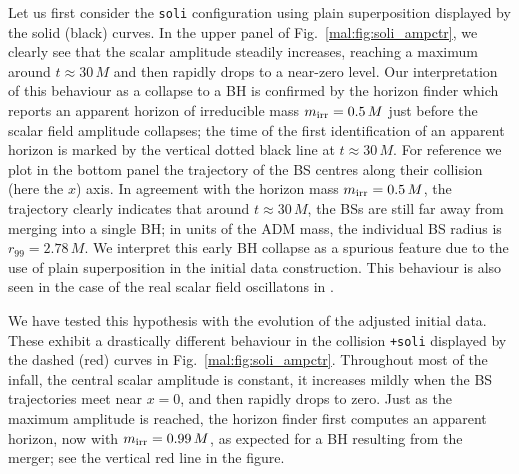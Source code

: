 %
Let us first consider the {\tt soli} configuration using plain
superposition displayed by the solid (black) curves. In the upper
panel of Fig.~\ref{mal:fig:soli_ampctr}, we clearly see
that the scalar amplitude steadily increases, reaching a maximum
around $t\approx 30\,M$ and then rapidly drops to a near-zero level.
Our interpretation of this behaviour as a collapse to a BH is confirmed
by the horizon finder which reports an apparent horizon of irreducible
mass $m_{\rm irr}=0.5\,M$ just before the scalar field amplitude
collapses; the time of the first identification of an apparent horizon
is marked by the vertical dotted black line at $t\approx 30\,M$.
For reference we plot in the bottom panel the trajectory of the BS centres
along their collision (here the $x$) axis. In agreement with the
horizon mass $m_{\rm irr}=0.5\,M$, the trajectory clearly indicates
that around $t\approx 30\,M$, the BSs are still far away from merging
into a single BH; in units of the ADM mass,
the individual BS radius is $r_{99}=2.78\,M$. We interpret
this early BH collapse as a spurious feature due to the use of
plain superposition in the initial data construction.
This behaviour is also seen in the case of the real scalar
field oscillatons in \cite{Helfer:2018vtq}.

We have tested this hypothesis with the evolution
of the adjusted initial data.
These exhibit a drastically different behaviour
in the collision {\tt +soli} displayed by the dashed (red) curves in
Fig.~\ref{mal:fig:soli_ampctr}.
Throughout most of the infall, the central scalar amplitude
is constant, it increases mildly when the BS trajectories meet near $x=0$,
and then rapidly drops to zero. Just as the maximum amplitude is reached,
the horizon finder first computes an apparent horizon, now with
$m_{\rm irr}=0.99\,M$, as expected for a BH resulting from the merger;
see the vertical red line in the figure.

